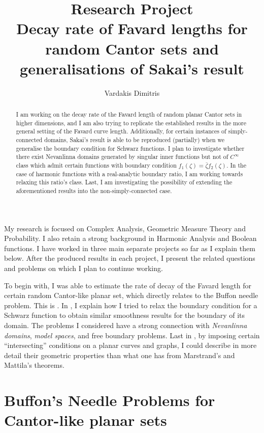 \documentclass[11pt]{amsart} %
\title{Research Project\\\smallskip\textnormal{\small {Decay rate of Favard lengths for random Cantor sets and generalisations of Sakai's result}}}
\author{Vardakis Dimitris}
\theoremstyle{remark} %
\theoremstyle{definition} %
\numberwithin{equation}{section} %
\newcommand{\0}[1]{\overline{#1}} %
\newcommand{\1}[1]{\tilde{#1}} %
\newcommand{\2}[1]{{}_{|#1}} %
\begin{document}
\begin{abstract}
	I am working on the decay rate of the Favard length of random planar Cantor sets in higher dimensions, and I am also trying to replicate the established results in the more general setting of the Favard curve length.
	Additionally, for certain instances of simply-connected domains, Sakai's result is able to be reproduced (partially) when we generalise the boundary condition for Schwarz functions. I plan to investigate whether there exist Nevanlinna domains generated by singular inner functions but not of $C^\infty$ class which admit certain functions with boundary condition $f_1(\zeta)=\bar{\zeta}f_2(\zeta)$. In the case of harmonic functions with a real-analytic boundary ratio, I am working towards relaxing this ratio's class. Last, I am investigating the possibility of extending the aforementioned results into the non-simply-connected case.
\end{abstract}

\maketitle

My research is focused on Complex Analysis, Geometric Measure Theory and Probability. I also retain a strong background in Harmonic Analysis and Boolean functions. I have worked in three main separate projects so far as I explain them below. After the produced results in each project, I present the related questions and problems on which I plan to continue working.

To begin with, I was able to estimate the rate of decay of the Favard length for certain random Cantor-like planar set, which directly relates to the Buffon needle problem. This is . In , I explain how I tried to relax the boundary condition for a Schwarz function to obtain similar smoothness results for the boundary of its domain. The problems I considered have a strong connection with \emph{Nevanlinna domains}, \emph{model spaces}, and free boundary problems. Last in , by imposing certain ``intersecting'' conditions on a planar curves and graphs, I could describe in more detail their geometric properties than what one has from Marstrand's and Mattila's theorems.


\section{Buffon's Needle Problems for Cantor-like planar sets}	\label{sec:Buffon}
\end{document}
